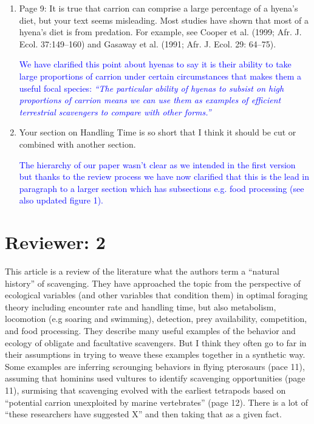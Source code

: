\documentclass[12pt,letterpaper]{article}
\begin{document}
\begin{enumerate}
\item{Page 9: It is true that carrion can comprise a large percentage of a hyena's diet, but your text seems misleading. Most studies have shown that most of a hyena's diet is from predation. For example, see Cooper et al. (1999; Afr. J. Ecol. 37:149–160) and Gasaway et al. (1991; Afr. J. Ecol. 29: 64–75).}

\textcolor{blue}{We have clarified this point about hyenas to say it is their ability to take large proportions of carrion under certain circumstances that makes them a useful focal species: \textit{``The particular ability of hyenas to subsist on high proportions of carrion means we can use them as examples of efficient terrestrial scavengers to compare with other forms.''}}

\item{Your section on Handling Time is so short that I think it should be cut or combined with another section.}

\textcolor{blue}{The hierarchy of our paper wasn't clear as we intended in the first version but thanks to the review process we have now clarified that this is the lead in paragraph to a larger section which has subsections e.g. food processing (see also updated figure 1).} 

\end{enumerate}

\section{Reviewer: 2}
This article is a review of the literature what the authors term a ``natural history'' of scavenging.
They have approached the topic from the perspective of ecological variables (and other variables that condition them) in optimal foraging theory including encounter rate and handling time, but also metabolism, locomotion (e.g soaring and swimming), detection, prey availability, competition, and food processing.
They describe many useful examples of the behavior and ecology of obligate and facultative scavengers.
But I think they often go to far in their assumptions in trying to weave these examples together in a synthetic way.
Some examples are inferring scrounging behaviors in flying pterosaurs (pace 11), assuming that hominins used vultures to identify scavenging opportunities (page 11), surmising that scavenging evolved with the earliest tetrapods based on ``potential carrion unexploited by marine vertebrates'' (page 12).
There is a lot of ``these researchers have suggested X'' and then taking that as a given fact.
\end{document}
